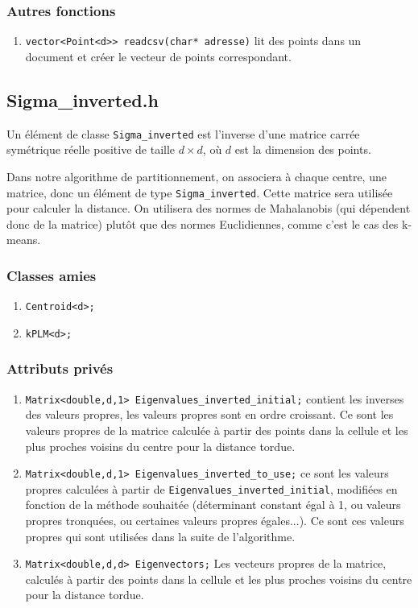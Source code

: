 \documentclass[10pt,a4paper,notitlepage]{article}
\begin{document}
\subsubsection{Autres fonctions}
\begin{enumerate}
\item \texttt{vector<Point<d>> readcsv(char* adresse)} lit des points dans un document et créer le vecteur de points correspondant.
\end{enumerate}

\subsection{Sigma\_inverted.h}

Un élément de classe \texttt{Sigma\_inverted} est l'inverse d'une matrice carrée symétrique réelle positive de taille $d\times d$, où $d$ est la dimension des points.

Dans notre algorithme de partitionnement, on associera à chaque centre, une matrice, donc un élément de type \texttt{Sigma\_inverted}. Cette matrice sera utilisée pour calculer la distance. On utilisera des normes de Mahalanobis (qui dépendent donc de la matrice) plutôt que des normes Euclidiennes, comme c'est le cas des k-means.

\subsubsection{Classes amies}
\begin{enumerate}
\item \texttt{Centroid<d>;}
\item \texttt{kPLM<d>;}
\end{enumerate}
\subsubsection{Attributs privés}
\begin{enumerate}
\item \texttt{Matrix<double,d,1> Eigenvalues\_inverted\_initial;} contient les inverses des valeurs propres, les valeurs propres sont en ordre croissant. Ce sont les valeurs propres de la matrice calculée à partir des points dans la cellule et les plus proches voisins du centre pour la distance tordue.
\item \texttt{Matrix<double,d,1> Eigenvalues\_inverted\_to\_use;} ce sont les valeurs propres calculées à partir de \texttt{Eigenvalues\_inverted\_initial}, modifiées en fonction de la méthode souhaitée (déterminant constant égal à 1, ou valeurs propres tronquées, ou certaines valeurs propres égales...). Ce sont ces valeurs propres qui sont utilisées dans la suite de l'algorithme.
\item \texttt{Matrix<double,d,d> Eigenvectors;} Les vecteurs propres de la matrice, calculés à partir des points dans la cellule et les plus proches voisins du centre pour la distance tordue.
\end{enumerate}
\end{document}
